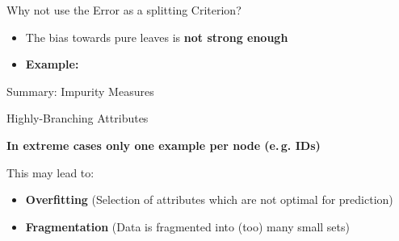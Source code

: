 \begin{frame}{Why not use the Error as a splitting Criterion?}{}
	\begin{itemize}
		\item The bias towards pure leaves is \textbf{not strong enough}
		\item \textbf{Example:}
	\end{itemize}
	
\end{frame}


\begin{frame}{Summary: Impurity Measures}{}
	
\end{frame}


\begin{frame}{Highly-Branching Attributes}{}
	\begin{boxBlueNoFrame}

		\vspace*{4mm}
		\textbf{In extreme cases only one example per node (e.\,g. IDs)}
	\end{boxBlueNoFrame}

	\begin{boxBlueNoFrame}
		This may lead to:
		\begin{itemize}
			\item \textbf{Overfitting} \footnotesize (Selection of attributes which are not optimal for prediction) \normalsize
			\item \textbf{Fragmentation} \footnotesize (Data is fragmented into (too) many small sets) \normalsize
		\end{itemize}
	\end{boxBlueNoFrame}
\end{frame}


